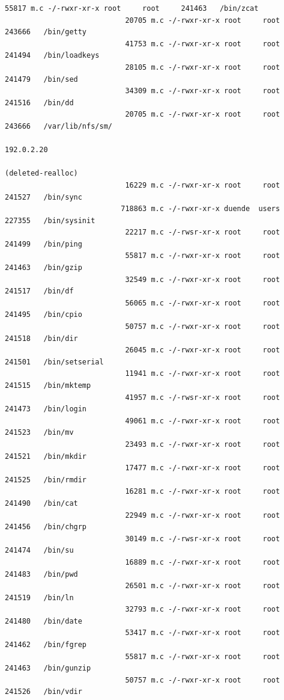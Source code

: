 {\begin{lstlisting}[style=terminal]
                            55817 m.c -/-rwxr-xr-x root     root     241463   /bin/zcat
                            20705 m.c -/-rwxr-xr-x root     root     243666   /bin/getty
                            41753 m.c -/-rwxr-xr-x root     root     241494   /bin/loadkeys
                            28105 m.c -/-rwxr-xr-x root     root     241479   /bin/sed
                            34309 m.c -/-rwxr-xr-x root     root     241516   /bin/dd
                            20705 m.c -/-rwxr-xr-x root     root     243666   /var/lib/nfs/sm/
                                                                              192.0.2.20 
                                                                              (deleted-realloc)
                            16229 m.c -/-rwxr-xr-x root     root     241527   /bin/sync
                           718863 m.c -/-rwxr-xr-x duende  users    227355   /bin/sysinit
                            22217 m.c -/-rwsr-xr-x root     root     241499   /bin/ping
                            55817 m.c -/-rwxr-xr-x root     root     241463   /bin/gzip
                            32549 m.c -/-rwxr-xr-x root     root     241517   /bin/df
                            56065 m.c -/-rwxr-xr-x root     root     241495   /bin/cpio
                            50757 m.c -/-rwxr-xr-x root     root     241518   /bin/dir
                            26045 m.c -/-rwxr-xr-x root     root     241501   /bin/setserial
                            11941 m.c -/-rwxr-xr-x root     root     241515   /bin/mktemp
                            41957 m.c -/-rwsr-xr-x root     root     241473   /bin/login
                            49061 m.c -/-rwxr-xr-x root     root     241523   /bin/mv
                            23493 m.c -/-rwxr-xr-x root     root     241521   /bin/mkdir
                            17477 m.c -/-rwxr-xr-x root     root     241525   /bin/rmdir
                            16281 m.c -/-rwxr-xr-x root     root     241490   /bin/cat
                            22949 m.c -/-rwxr-xr-x root     root     241456   /bin/chgrp
                            30149 m.c -/-rwsr-xr-x root     root     241474   /bin/su
                            16889 m.c -/-rwxr-xr-x root     root     241483   /bin/pwd
                            26501 m.c -/-rwxr-xr-x root     root     241519   /bin/ln
                            32793 m.c -/-rwxr-xr-x root     root     241480   /bin/date
                            53417 m.c -/-rwxr-xr-x root     root     241462   /bin/fgrep
                            55817 m.c -/-rwxr-xr-x root     root     241463   /bin/gunzip
                            50757 m.c -/-rwxr-xr-x root     root     241526   /bin/vdir

\end{lstlisting}}

